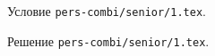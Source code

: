 \problem
Условие \texttt{pers-combi/senior/1.tex}.

\solution Решение \texttt{pers-combi/senior/1.tex}.
\endproblem
